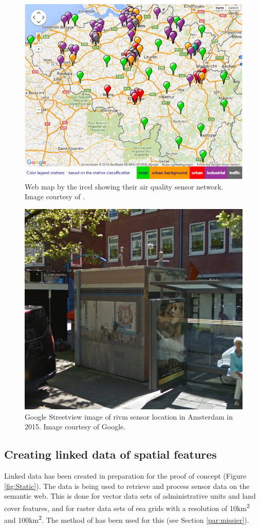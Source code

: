 \begin{figure}
	\centering
	\includegraphics[width=0.8\linewidth]{figs/IRCELINESensors.png}
	\caption{Web map by the \acf*{ircel} showing their air quality sensor network. Image courtesy of \cite{DATA:IRCEL}.}
	\label{fig:IRCELINESensor}
\end{figure}

\begin{figure}
	\centering
	\includegraphics[width=0.8\linewidth]{figs/SensorAdam.png}
	\caption{Google Streetview image of \acs*{rivm} sensor location in Amsterdam in 2015. Image courtesy of Google.}
	\label{fig:Sensor}
\end{figure}

\subsection{Creating linked data of spatial features}
\label{linked}
Linked data has been created in preparation for the proof of concept (Figure \ref{fig:Static}). The data is being used to retrieve and process sensor data on the semantic web. This is done for vector data sets of administrative units and land cover features, and for raster data sets of \ac{eea} grids with a resolution of 10km\textsuperscript{2} and 100km\textsuperscript{2}. The method of \cite{LD:Missier} has been used for this (see Section \ref{par:missier}).

